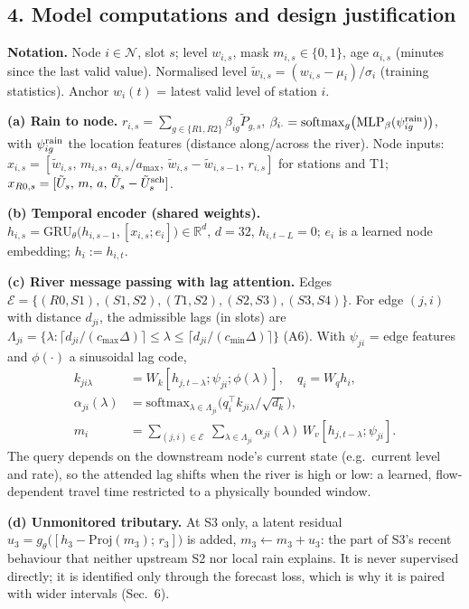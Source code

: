 \subsection*{4. Model computations and design justification}
\noindent\textbf{Notation.} Node $i\in\mathcal N$, slot $s$; level $w_{i,s}$, mask $m_{i,s}\in\{0,1\}$, age $a_{i,s}$ (minutes since the last
valid value). Normalised level $\tilde w_{i,s}=(w_{i,s}-\mu_i)/\sigma_i$ (training statistics). Anchor $w_i(t)$ = latest valid level of station $i$.

\noindent\textbf{(a) Rain to node.} $r_{i,s}=\sum_{g\in\{R1,R2\}}\beta_{ig}\tilde P_{g,s}$, $\beta_{i\cdot}=\mathrm{softmax}_g\big(\mathrm{MLP}_\beta(\psi^{\rm rain}_{ig})\big)$,
with $\psi^{\rm rain}_{ig}$ the location features (distance along/across the river). Node inputs:
$x_{i,s}=[\tilde w_{i,s},\,m_{i,s},\,a_{i,s}/a_{\max},\,\tilde w_{i,s}-\tilde w_{i,s-1},\,r_{i,s}]$ for stations and T1;
$x_{R0,s}=[\tilde U_s,\,m,\,a,\,\tilde U_s-\tilde U^{\rm sch}_s]$.

\noindent\textbf{(b) Temporal encoder (shared weights).}
$h_{i,s}=\mathrm{GRU}_\theta\big(h_{i,s-1},[x_{i,s};e_i]\big)\in\mathbb R^{d}$, $d=32$, $h_{i,t-L}=0$; $e_i$ is a learned node embedding;
$h_i:=h_{i,t}$.

\noindent\textbf{(c) River message passing with lag attention.} Edges $\mathcal E=\{(R0,S1),(S1,S2),(T1,S2),(S2,S3),(S3,S4)\}$.
For edge $(j,i)$ with distance $d_{ji}$, the admissible lags (in slots) are
$\Lambda_{ji}=\{\lambda:\lceil d_{ji}/(c_{\max}\Delta)\rceil\le\lambda\le\lceil d_{ji}/(c_{\min}\Delta)\rceil\}$ (A6). With $\psi_{ji}$ = edge features and $\phi(\cdot)$ a sinusoidal lag code,
\begin{align}
k_{ji\lambda}&=W_k[h_{j,t-\lambda};\psi_{ji};\phi(\lambda)],\quad q_i=W_q h_i,\\
\alpha_{ji}(\lambda)&=\mathrm{softmax}_{\lambda\in\Lambda_{ji}}\!\big(q_i^{\!\top}k_{ji\lambda}/\sqrt{d_k}\big),\\
m_i&=\sum_{(j,i)\in\mathcal E}\ \sum_{\lambda\in\Lambda_{ji}}\alpha_{ji}(\lambda)\,W_v[h_{j,t-\lambda};\psi_{ji}].
\end{align}
The query depends on the downstream node's current state (e.g.\ current level and rate), so the attended lag shifts when the river is high or low:
a learned, flow-dependent travel time restricted to a physically bounded window.

\noindent\textbf{(d) Unmonitored tributary.} At S3 only, a latent residual $u_3=g_\theta\big([h_3-\mathrm{Proj}(m_3);\,r_3]\big)$ is added, $m_3\leftarrow m_3+u_3$:
the part of S3's recent behaviour that neither upstream S2 nor local rain explains. It is never supervised directly; it is identified only through the forecast loss, which is why it is paired with wider intervals (Sec.~6).

